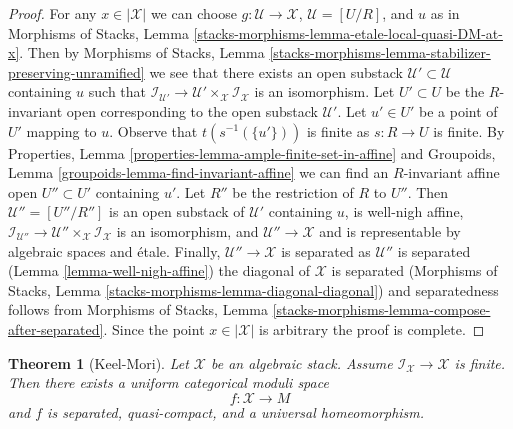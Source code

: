 \documentclass{stacks-project}
\theoremstyle{plain}
\newtheorem{theorem}[subsection]{Theorem}
\theoremstyle{definition}
\theoremstyle{remark}
\numberwithin{equation}{subsection}
\begin{document}
\begin{proof}
For any $x \in |\mathcal{X}|$ we can choose
$g : \mathcal{U} \to \mathcal{X}$, $\mathcal{U} = [U/R]$, and $u$ as in
Morphisms of Stacks,
Lemma \ref{stacks-morphisms-lemma-etale-local-quasi-DM-at-x}.
Then by
Morphisms of Stacks, Lemma
\ref{stacks-morphisms-lemma-stabilizer-preserving-unramified}
we see that there exists an open substack
$\mathcal{U}' \subset \mathcal{U}$ containing $u$
such that $\mathcal{I}_{\mathcal{U}'} \to
\mathcal{U}' \times_\mathcal{X} \mathcal{I}_\mathcal{X}$
is an isomorphism.
Let $U' \subset U$ be the $R$-invariant open corresponding to
the open substack $\mathcal{U}'$.
Let $u' \in U'$ be a point of $U'$ mapping to $u$.
Observe that $t(s^{-1}(\{u'\}))$ is finite as $s : R \to U$ is finite.
By Properties, Lemma \ref{properties-lemma-ample-finite-set-in-affine}
and Groupoids, Lemma \ref{groupoids-lemma-find-invariant-affine}
we can find an $R$-invariant affine open $U'' \subset U'$
containing $u'$. Let $R''$ be the restriction of $R$ to $U''$.
Then $\mathcal{U}'' = [U''/R'']$ is an open substack of
$\mathcal{U}'$ containing $u$, is well-nigh affine,
$\mathcal{I}_{\mathcal{U}''} \to
\mathcal{U}'' \times_\mathcal{X} \mathcal{I}_\mathcal{X}$
is an isomorphism, and $\mathcal{U}'' \to \mathcal{X}$
and is representable by algebraic spaces and \'etale.
Finally, $\mathcal{U}'' \to \mathcal{X}$ is separated as
$\mathcal{U}''$ is separated (Lemma \ref{lemma-well-nigh-affine})
the diagonal of $\mathcal{X}$ is separated
(Morphisms of Stacks, Lemma \ref{stacks-morphisms-lemma-diagonal-diagonal})
and separatedness follows from Morphisms of Stacks, Lemma
\ref{stacks-morphisms-lemma-compose-after-separated}.
Since the point $x \in |\mathcal{X}|$ is arbitrary the proof is complete.
\end{proof}

\begin{theorem}[Keel-Mori]
\label{theorem-keel-mori}
Let $\mathcal{X}$ be an algebraic stack. Assume
$\mathcal{I}_\mathcal{X} \to \mathcal{X}$ is finite.
Then there exists a uniform categorical moduli space
$$
f : \mathcal{X} \longrightarrow M
$$
and $f$ is separated, quasi-compact, and a universal homeomorphism.
\end{theorem}
\end{document}
